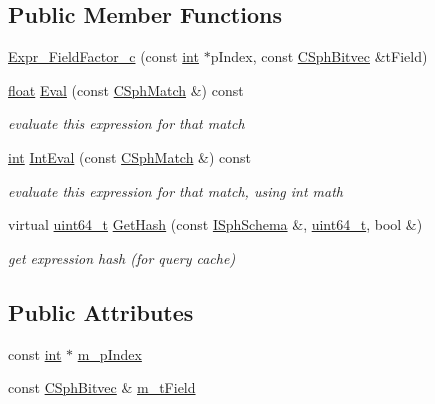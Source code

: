 \subsection*{Public Member Functions}
\begin{DoxyCompactItemize}
\item 
\hyperlink{structExpr__FieldFactor__c_3_01CSphBitvec_01_4_a3aff75aa636bd86e41261ba1da9e271f}{Expr\-\_\-\-Field\-Factor\-\_\-c} (const \hyperlink{sphinxexpr_8cpp_a4a26e8f9cb8b736e0c4cbf4d16de985e}{int} $\ast$p\-Index, const \hyperlink{classCSphBitvec}{C\-Sph\-Bitvec} \&t\-Field)
\item 
\hyperlink{sphinxexpr_8cpp_a0e0d0739f7035f18f949c2db2c6759ec}{float} \hyperlink{structExpr__FieldFactor__c_3_01CSphBitvec_01_4_a572fc943f8019d4d02223a1e52a94c2d}{Eval} (const \hyperlink{classCSphMatch}{C\-Sph\-Match} \&) const 
\begin{DoxyCompactList}\small\item\em evaluate this expression for that match \end{DoxyCompactList}\item 
\hyperlink{sphinxexpr_8cpp_a4a26e8f9cb8b736e0c4cbf4d16de985e}{int} \hyperlink{structExpr__FieldFactor__c_3_01CSphBitvec_01_4_a6c20c23972de114112be974be6124313}{Int\-Eval} (const \hyperlink{classCSphMatch}{C\-Sph\-Match} \&) const 
\begin{DoxyCompactList}\small\item\em evaluate this expression for that match, using int math \end{DoxyCompactList}\item 
virtual \hyperlink{sphinxstd_8h_aaa5d1cd013383c889537491c3cfd9aad}{uint64\-\_\-t} \hyperlink{structExpr__FieldFactor__c_3_01CSphBitvec_01_4_ab3e9ac6d73898741f4bbff9b0762a717}{Get\-Hash} (const \hyperlink{classISphSchema}{I\-Sph\-Schema} \&, \hyperlink{sphinxstd_8h_aaa5d1cd013383c889537491c3cfd9aad}{uint64\-\_\-t}, bool \&)
\begin{DoxyCompactList}\small\item\em get expression hash (for query cache) \end{DoxyCompactList}\end{DoxyCompactItemize}
\subsection*{Public Attributes}
\begin{DoxyCompactItemize}
\item 
const \hyperlink{sphinxexpr_8cpp_a4a26e8f9cb8b736e0c4cbf4d16de985e}{int} $\ast$ \hyperlink{structExpr__FieldFactor__c_3_01CSphBitvec_01_4_a552f3a1ef3d679103fd010ae2f1e2f92}{m\-\_\-p\-Index}
\item 
const \hyperlink{classCSphBitvec}{C\-Sph\-Bitvec} \& \hyperlink{structExpr__FieldFactor__c_3_01CSphBitvec_01_4_a8b48fe84f53fb9d687047640d68451df}{m\-\_\-t\-Field}
\end{DoxyCompactItemize}
